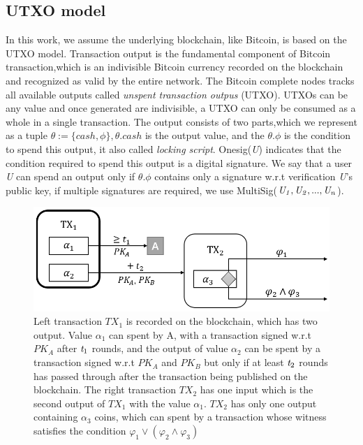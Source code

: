 \documentclass[conference]{IEEEtran}
\begin{document}
\subsection{UTXO model}

In this work, we assume the underlying blockchain, like Bitcoin, is based on the UTXO model. Transaction output is the fundamental 
component of Bitcoin transaction,which is an indivisible Bitcoin currency recorded on the blockchain and recognized as valid by 
the entire network. The Bitcoin complete nodes tracks all available outputs called \emph{unspent transaction outpus} (UTXO). 
UTXOs can be any value and once generated are indivisible, a UTXO can only be consumed as a whole in a single transaction. 
The output consists of two parts,which we represent as a tuple $\theta :=\{cash,\phi\}, \theta.cash$ is the output value,
 and the $\theta.\phi$ is the condition to spend this output, it also called \emph{locking script}. Onesig(\emph{U}) indicates 
 that the condition required to spend this output is a digital signature. We say that a user \emph{U} can spend an output only if
 $\theta.\phi$ contains only a signature w.r.t verification \emph{U}'s public key, if multiple signatures are required, we use 
 MultiSig($\it U_1,U_2,...,U_n$).

\begin{figure}[t]
    \centering
    \includegraphics[scale=0.5]{fig2.png}
    \caption{Left transaction $TX_1$ is recorded on the blockchain, which has two output. Value $\alpha_1$ can spent by A, with a 
    transaction signed w.r.t $PK_A$ after $\emph{t}_1$ rounds, and the output of value $\alpha_2$ can be spent by a transaction signed w.r.t 
    $PK_A$ and $PK_B$ but only if at least $\emph{t}_2$ rounds has passed through after the transaction being published on the blockchain. The
    right transaction $TX_2$ has one input which is the second output of $TX_1$ with the value $\alpha_1$. $TX_2$ has only one
    output containing $\alpha_3$ coins, which can spent by a transaction whose witness satisfies the condition $\varphi_1 \vee (\varphi_2 
    \wedge \varphi_3)$}
\end{figure}
\end{document}
